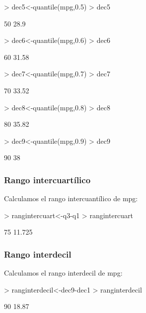 \documentclass [a4paper] {article}
\begin{document}
\begin{Schunk}
\begin{Sinput}
> dec5<-quantile(mpg,0.5)
> dec5
\end{Sinput}
\begin{Soutput}
 50%
28.9 
\end{Soutput}
\begin{Sinput}
> dec6<-quantile(mpg,0.6)
> dec6
\end{Sinput}
\begin{Soutput}
  60%
31.58 
\end{Soutput}
\begin{Sinput}
> dec7<-quantile(mpg,0.7)
> dec7
\end{Sinput}
\begin{Soutput}
  70%
33.52 
\end{Soutput}
\begin{Sinput}
> dec8<-quantile(mpg,0.8)
> dec8
\end{Sinput}
\begin{Soutput}
  80%
35.82 
\end{Soutput}
\begin{Sinput}
> dec9<-quantile(mpg,0.9)
> dec9 
\end{Sinput}
\begin{Soutput}
90%
 38 
\end{Soutput}
\end{Schunk}

\subsubsection{Rango intercuartílico}
Calculamos el rango intercuantílico de mpg:

\begin{Schunk}
\begin{Sinput}
> rangintercuart<-q3-q1
> rangintercuart
\end{Sinput}
\begin{Soutput}
   75%
11.725 
\end{Soutput}
\end{Schunk}
\subsubsection{Rango interdecil}
Calculamos el rango interdecil de mpg:

\begin{Schunk}
\begin{Sinput}
> ranginterdecil<-dec9-dec1
> ranginterdecil
\end{Sinput}
\begin{Soutput}
  90%
18.87 
\end{Soutput}
\end{Schunk}
\end{document}
